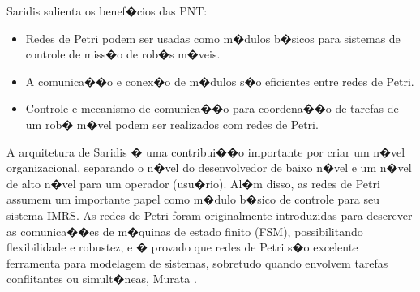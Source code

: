 


Saridis salienta os benef�cios das PNT:
\begin{itemize}
  \item Redes de Petri podem ser usadas como m�dulos b�sicos para sistemas de
  controle de miss�o de rob�s m�veis.
  \item A comunica��o e conex�o de m�dulos s�o eficientes entre redes de Petri.
  \item Controle e mecanismo de comunica��o para coordena��o de tarefas de um
  rob� m�vel podem ser realizados com redes de Petri.
\end{itemize} 

A arquitetura de Saridis � uma contribui��o importante por criar um n�vel
organizacional, separando o n�vel do desenvolvedor de baixo n�vel e um
n�vel de alto n�vel para um operador (usu�rio). Al�m disso, as redes de Petri
assumem um importante papel como m�dulo b�sico de controle para seu sistema
IMRS. As redes de Petri foram originalmente introduzidas para descrever as
comunica��es de m�quinas de estado finito (FSM), possibilitando flexibilidade
e robustez, e � provado que redes de Petri s�o excelente ferramenta para
modelagem de sistemas, sobretudo quando envolvem tarefas conflitantes ou
simult�neas, Murata \cite{murata1989petri}.


